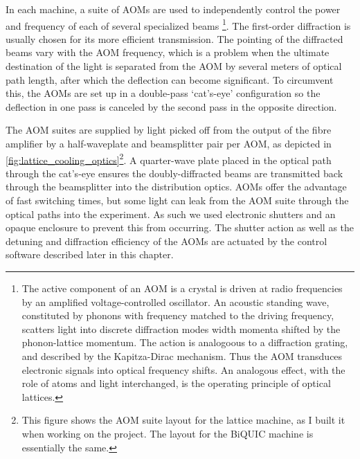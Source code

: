 	In each machine, a suite of AOMs are used to independently control the power and frequency of each of several specialized beams \footnote{The active component of an AOM is a crystal is driven at radio frequencies by an amplified voltage-controlled oscillator. An acoustic standing wave, constituted by phonons with frequency matched to the driving frequency, scatters light into discrete diffraction modes width momenta shifted by the phonon-lattice momentum. The action is analogoous to a diffraction grating, and described by the Kapitza-Dirac mechanism. Thus the AOM transduces electronic signals into optical frequency shifts. An analogous effect, with the role of atoms and light interchanged, is the operating principle of optical lattices.}. The first-order diffraction is usually chosen for its more efficient transmission. The pointing of the diffracted beams vary with the AOM frequency, which is a problem when the ultimate destination of the light is separated from the AOM by several meters of optical path length, after which the deflection can become significant. To circumvent this, the AOMs are set up in a double-pass `cat's-eye' configuration so the deflection in one pass is canceled by the second pass in the opposite direction.
	
	The AOM suites are supplied by light picked off from the output of the fibre amplifier by a half-waveplate and beamsplitter pair per AOM, as depicted in \ref{fig:lattice_cooling_optics}\footnote{This figure shows the AOM suite layout for the lattice machine, as I built it when working on the project. The layout for the BiQUIC machine is essentially the same.}. A quarter-wave plate placed in the optical path through the cat's-eye ensures the doubly-diffracted beams are transmitted back through the beamsplitter into the distribution optics. AOMs offer the advantage of fast switching times, but some light can leak from the AOM suite through the optical paths into the experiment. As such we used electronic shutters and an opaque enclosure to prevent this from occurring. The shutter action as well as the detuning and diffraction efficiency of the AOMs are actuated by the control software described later in this chapter. 
	


